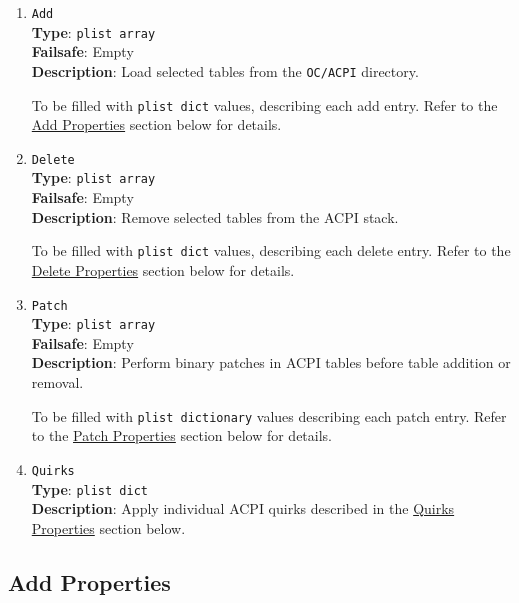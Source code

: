 \documentclass[]{article}
\makeatletter
\renewcommand{\label}[1]{%
\zref@wrapper@immediate{\oldlabel{#1}}}  %
\makeatother
\begin{document}
\begin{enumerate}

\item
  \texttt{Add}\\
  \textbf{Type}: \texttt{plist\ array}\\
  \textbf{Failsafe}: Empty\\
  \textbf{Description}: Load selected tables from the \texttt{OC/ACPI}
  directory.

  To be filled with \texttt{plist\ dict} values, describing each add entry.
  Refer to the \hyperref[acpipropsadd]{Add Properties} section below for details.

\item
  \texttt{Delete}\\
  \textbf{Type}: \texttt{plist\ array}\\
  \textbf{Failsafe}: Empty\\
  \textbf{Description}: Remove selected tables from the ACPI stack.

  To be filled with \texttt{plist\ dict} values, describing each delete entry.
  Refer to the \hyperref[acpipropsdelete]{Delete Properties} section below for details.

\item
  \texttt{Patch}\\
  \textbf{Type}: \texttt{plist\ array}\\
  \textbf{Failsafe}: Empty\\
  \textbf{Description}: Perform binary patches in ACPI tables before
  table addition or removal.

  To be filled with \texttt{plist\ dictionary} values describing each patch entry.
  Refer to the \hyperref[acpipropspatch]{Patch Properties} section below for details.

\item
  \texttt{Quirks}\\
  \textbf{Type}: \texttt{plist\ dict}\\
  \textbf{Description}: Apply individual ACPI quirks described
  in the \hyperref[acpipropsquirks]{Quirks Properties} section below.

\end{enumerate}

\subsection{Add Properties}\label{acpipropsadd}
\end{document}
